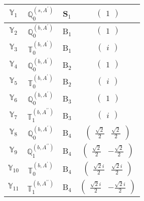 \documentclass[fleqn,10pt,landscape]{article}
\begin{document}
\begin{itemize}
\begin{center}
\begin{longtable}{c|c|c|c}
$ \mathbb{Y}_{1} $ & $\mathbb{Q}_{0}^{(s,A^{\prime})}$ & S$_{1}$ & $\begin{pmatrix} 1 \end{pmatrix}$ \\ \hline
$ \mathbb{Y}_{2} $ & $\mathbb{Q}_{0}^{(b,A^{\prime})}$ & B$_{1}$ & $\begin{pmatrix} 1 \end{pmatrix}$ \\
$ \mathbb{Y}_{3} $ & $\mathbb{T}_{0}^{(b,A^{\prime})}$ & B$_{1}$ & $\begin{pmatrix} i \end{pmatrix}$ \\ \hline
$ \mathbb{Y}_{4} $ & $\mathbb{Q}_{0}^{(b,A^{\prime})}$ & B$_{2}$ & $\begin{pmatrix} 1 \end{pmatrix}$ \\
$ \mathbb{Y}_{5} $ & $\mathbb{T}_{0}^{(b,A^{\prime})}$ & B$_{2}$ & $\begin{pmatrix} i \end{pmatrix}$ \\ \hline
$ \mathbb{Y}_{6} $ & $\mathbb{Q}_{0}^{(b,A^{\prime})}$ & B$_{3}$ & $\begin{pmatrix} 1 \end{pmatrix}$ \\
$ \mathbb{Y}_{7} $ & $\mathbb{T}_{1}^{(b,A^{\prime\prime})}$ & B$_{3}$ & $\begin{pmatrix} i \end{pmatrix}$ \\ \hline
$ \mathbb{Y}_{8} $ & $\mathbb{Q}_{0}^{(b,A^{\prime})}$ & B$_{4}$ & $\begin{pmatrix} \frac{\sqrt{2}}{2} & \frac{\sqrt{2}}{2} \end{pmatrix}$ \\
$ \mathbb{Y}_{9} $ & $\mathbb{Q}_{1}^{(b,A^{\prime\prime})}$ & B$_{4}$ & $\begin{pmatrix} \frac{\sqrt{2}}{2} & - \frac{\sqrt{2}}{2} \end{pmatrix}$ \\
$ \mathbb{Y}_{10} $ & $\mathbb{T}_{0}^{(b,A^{\prime})}$ & B$_{4}$ & $\begin{pmatrix} \frac{\sqrt{2} i}{2} & \frac{\sqrt{2} i}{2} \end{pmatrix}$ \\
$ \mathbb{Y}_{11} $ & $\mathbb{T}_{1}^{(b,A^{\prime\prime})}$ & B$_{4}$ & $\begin{pmatrix} \frac{\sqrt{2} i}{2} & - \frac{\sqrt{2} i}{2} \end{pmatrix}$ \\ \hline

\end{longtable}
\end{center}
\end{itemize}
\end{document}

